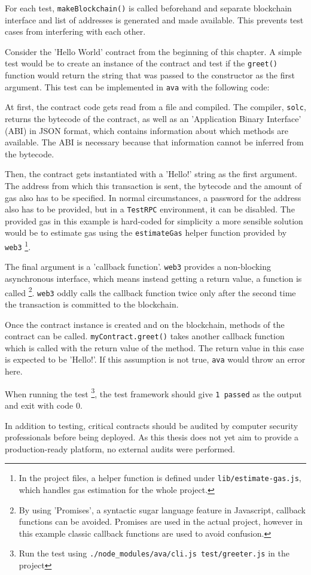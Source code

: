 For each test, \texttt{makeBlockchain()} is called beforehand and separate blockchain interface and list of addresses is generated and made available. This prevents test cases from interfering with each other.

Consider the 'Hello World' contract from the beginning of this chapter. A simple test would be to create an instance of the contract and test if the \texttt{greet()} function would return the string that was passed to the constructor as the first argument. This test can be implemented in \texttt{ava} with the following code:



At first, the contract code gets read from a file and compiled. The compiler, \texttt{solc}, returns the bytecode of the contract, as well as an 'Application Binary Interface' (ABI) in JSON format, which contains information about which methods are available. The ABI is necessary because that information cannot be inferred from the bytecode.

Then, the contract gets instantiated with a 'Hello!' string as the first argument. The address from which this transaction is sent, the bytecode and the amount of gas also has to be specified.
In normal circumstances, a password for the address also has to be provided, but in a \texttt{TestRPC} environment, it can be disabled.
The provided gas in this example is hard-coded for simplicity \textendash{} a more sensible solution would be to estimate gas using the \texttt{estimateGas} helper function provided by \texttt{web3} \footnote{In the project files, a helper function is defined under \texttt{lib/estimate-gas.js}, which handles gas estimation for the whole project.}.

The final argument is a 'callback function'. \texttt{web3} provides a non-blocking asynchronous interface, which means instead getting a return value, a function is called \footnote{By using 'Promises', a syntactic sugar language feature in Javascript, callback functions can be avoided. Promises are used in  the actual project, however in this example classic callback functions are used to avoid confusion.}.
\texttt{web3} oddly calls the callback function twice \textendash{} only after the second time the transaction is committed to the blockchain.

Once the contract instance is created and on the blockchain, methods of the contract can be called. \texttt{myContract.greet()} takes another callback function which is called with the return value of the method. The return value in this case is expected to be 'Hello!'. If this assumption is not true, \texttt{ava} would throw an error here.

When running the test \footnote{Run the test using \texttt{./node\_modules/ava/cli.js test/greeter.js} in the project}, the test framework should give \texttt{1 passed} as the output and exit with code 0.

In addition to testing, critical contracts should be audited by computer security professionals before being deployed. As this thesis does not yet aim to provide a production-ready platform, no external audits were performed.
